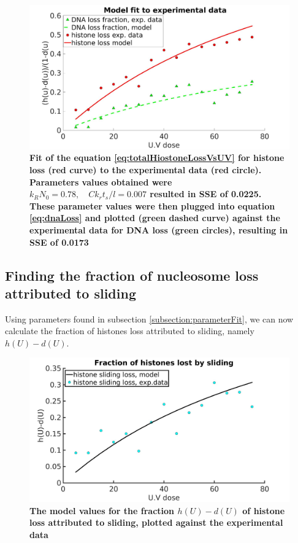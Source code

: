 \documentclass[12pt]{article}
\newcommand{\beq}{\begin{eqnarray}}
\newcommand{\eeq}{\end{eqnarray}}
\begin{document}
\begin{figure}[H]
\centering
\includegraphics[width=0.5\linewidth, height=0.3\textheight]{histoneAndDnaVsUvDoseModelFit}
\caption{\textbf{Fit of the equation \ref{eq:totalHiostoneLossVsUV} for histone loss (red curve) to the experimental data (red circle). Parameters values obtained were $k_RN_0 =0.78,\quad Ck_rt_s/l=0.007$ resulted in SSE of 0.0225. These parameter values were then plugged into equation \ref{eq:dnaLoss} and plotted (green dashed curve) against the experimental data for DNA loss (green circles), resulting in SSE of 0.0173}}
\label{fig:histoneAndDnaVsUvDoseModelFit}
\end{figure}

\subsection{Finding the fraction of nucleosome loss attributed to sliding}\label{subsection:lossAttributedToSliding}


Using parameters found in subsection \ref{subsection:parameterFit}, we can now calculate the fraction of histones loss attributed to sliding, namely $h(U)-d(U)$.

\begin{figure}[H]
\centering
\includegraphics[width=0.5\linewidth, height=0.3\textheight]{hVsUVDoseModelFit01}
\caption{\textbf{The model values for the fraction $h(U)-d(U)$ of histone loss attributed to sliding, plotted against the experimental data}}
\label{fig:hVsUVDoseModelFit01}
\end{figure}
\end{document}
